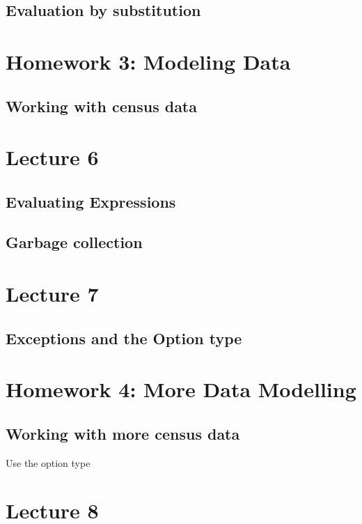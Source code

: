 \documentclass{book}
\begin{document}
\section{Evaluation by substitution}

\chapter{Homework 3: Modeling Data}

\section{Working with census data}

\chapter{Lecture 6}

\section{Evaluating Expressions}

\section{Garbage collection}

\chapter{Lecture 7}

\section{Exceptions and the Option type}

\chapter{Homework 4: More Data Modelling}

\section{Working with more census data}

Use the option type

\chapter{Lecture 8}
\end{document}

